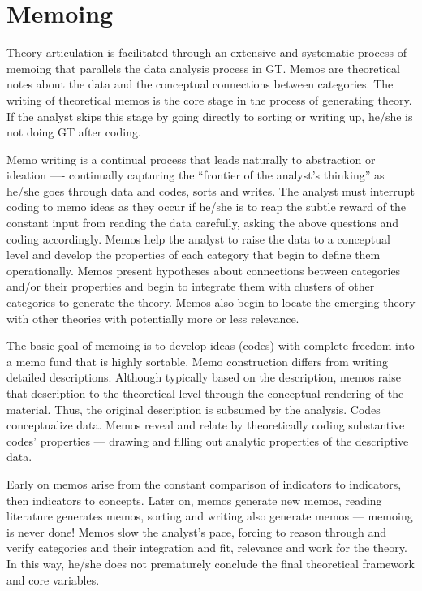 \section*{Memoing}

Theory articulation is facilitated through an extensive and systematic process of memoing that parallels the data analysis process in GT. 
Memos are theoretical notes about the data and the conceptual connections between categories. 
The writing of theoretical memos is the core stage in the process of generating theory. 
If the analyst skips this stage by going directly to sorting or writing up, he/she is not doing GT after coding.

Memo writing is a continual process that leads naturally to abstraction or
ideation
---- continually capturing the “frontier of the analyst’s thinking” as he/she
goes through data and codes, sorts and writes. 
The analyst must interrupt coding to memo ideas as they occur if he/she is to reap the subtle reward of the constant input from reading the data carefully, 
asking the above questions and coding accordingly. 
Memos help the analyst to raise the data to a conceptual level and develop the properties of each category that begin to define them operationally.
Memos present hypotheses about connections between categories and/or their properties and begin to integrate them with clusters of other categories to generate the theory.
Memos also begin to locate the emerging theory with other theories with potentially more or less relevance.

The basic goal of memoing is to develop ideas (codes) with complete freedom into a memo fund that is highly sortable. 
Memo construction differs from writing detailed descriptions. 
Although typically based on the description, memos raise that description to the theoretical level through the conceptual rendering of the material. 
Thus, the original description is subsumed by the analysis. 
Codes conceptualize data. 
Memos reveal and relate by theoretically coding substantive codes' properties --- drawing and filling out analytic properties of the descriptive data.

Early on memos arise from the constant comparison of indicators to indicators, 
then indicators to concepts. 
Later on, memos generate new memos, 
reading literature generates memos, 
sorting and writing also generate memos
--- memoing is never done! 
Memos slow the analyst’s pace, 
forcing to reason through and verify categories and their integration and fit, 
relevance and work for the theory.
In this way, he/she does not prematurely conclude the final theoretical framework and core variables.

